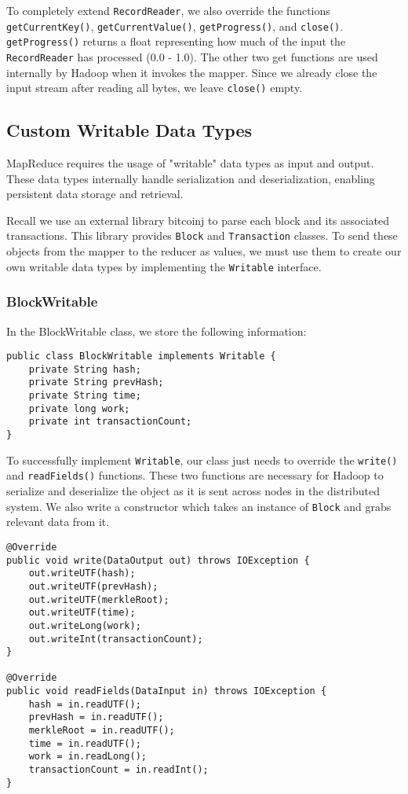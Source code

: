 \documentclass[9pt,twocolumn,twoside]{idsi}
\begin{document}
To completely extend \lstinline{RecordReader}, we also override the functions \lstinline{getCurrentKey()}, \lstinline{getCurrentValue()}, \lstinline{getProgress()}, and \lstinline{close()}. \lstinline{getProgress()} returns a float representing how much of the input the \lstinline{RecordReader} has processed (0.0 - 1.0). The other two get functions are used internally by Hadoop when it invokes the mapper. Since we already close the input stream after reading all bytes, we leave \lstinline{close()} empty.

\subsection{Custom Writable Data Types}

MapReduce requires the usage of "writable" data types as input and output. These data types internally handle serialization and deserialization, enabling persistent data storage and retrieval.

Recall we use an external library bitcoinj to parse each block and its associated transactions. This library provides \lstinline{Block} and \lstinline{Transaction} classes. To send these objects from the mapper to the reducer as values, we must use them to create our own writable data types by implementing the \lstinline{Writable} interface.

\subsubsection{BlockWritable}
In the BlockWritable class, we store the following information:

\begin{lstlisting}
public class BlockWritable implements Writable {
    private String hash;
    private String prevHash;
    private String time;
    private long work;
    private int transactionCount;
}
\end{lstlisting}

To successfully implement \lstinline{Writable}, our class just needs to override the \lstinline{write()} and \lstinline{readFields()} functions. These two functions are necessary for Hadoop to serialize and deserialize the object as it is sent across nodes in the distributed system. We also write a  constructor which takes an instance of \lstinline{Block} and grabs relevant data from it.

\begin{lstlisting}
@Override
public void write(DataOutput out) throws IOException {
    out.writeUTF(hash);
    out.writeUTF(prevHash);
    out.writeUTF(merkleRoot);
    out.writeUTF(time);
    out.writeLong(work);
    out.writeInt(transactionCount);
}

@Override
public void readFields(DataInput in) throws IOException {
    hash = in.readUTF();
    prevHash = in.readUTF();
    merkleRoot = in.readUTF();
    time = in.readUTF();
    work = in.readLong();
    transactionCount = in.readInt();
}
\end{lstlisting}
\end{document}
